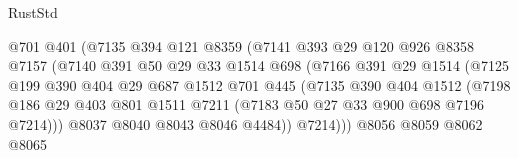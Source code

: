 \begin{lexlean}{RustStd}
\begin{coremodule}
{\begin{coremodule}
{{{{{{{{{{{{{{{{{{{{                                  @701
                                  @401
                                  (@7135
                                    @394
                                    @121
                                    @8359
                                    (@7141
                                      @393
                                      @29
                                      @120
                                      @926
                                      @8358
                                      @7157
                                      (@7140
                                        @391
                                        @50
                                        @29
                                        @33
                                        @1514
                                        @698
                                        (@7166
                                          @391
                                          @29
                                          @1514
                                          (@7125
                                            @199
                                            @390
                                            @404
                                            @29
                                            @687
                                            @1512
                                            @701
                                            @445
                                            (@7135
                                              @390
                                              @404
                                              @1512
                                              (@7198
                                                @186
                                                @29
                                                @403
                                                @801
                                                @1511
                                                @7211
                                                (@7183 @50 @27 @33 @900 @698 @7196 @7214)))
                                            @8037
                                            @8040
                                            @8043
                                            @8046
                                            @4484))
                                        @7214)))
                                  @8056
                                  @8059
                                  @8062
                                  @8065
}}}}}}}}}}}}}}}}}}}}
\end{coremodule}}
\end{coremodule}
\end{lexlean}
